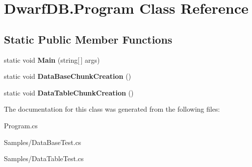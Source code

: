 \hypertarget{class_dwarf_d_b_1_1_program}{\section{Dwarf\+D\+B.\+Program Class Reference}
\label{class_dwarf_d_b_1_1_program}
}
\subsection*{Static Public Member Functions}
\begin{DoxyCompactItemize}
\item 
\hypertarget{class_dwarf_d_b_1_1_program_ad191792c625399b2912062074ad4476b}{static void {\bfseries Main} (string\mbox{[}$\,$\mbox{]} args)}\label{class_dwarf_d_b_1_1_program_ad191792c625399b2912062074ad4476b}

\item 
\hypertarget{class_dwarf_d_b_1_1_program_af6bc5554955f41aa161cd638dd1fcbc1}{static void {\bfseries Data\+Base\+Chunk\+Creation} ()}\label{class_dwarf_d_b_1_1_program_af6bc5554955f41aa161cd638dd1fcbc1}

\item 
\hypertarget{class_dwarf_d_b_1_1_program_abab621dfeced1fb0c770bd5a1dffe3a6}{static void {\bfseries Data\+Table\+Chunk\+Creation} ()}\label{class_dwarf_d_b_1_1_program_abab621dfeced1fb0c770bd5a1dffe3a6}

\end{DoxyCompactItemize}


The documentation for this class was generated from the following files\+:\begin{DoxyCompactItemize}
\item 
Program.\+cs\item 
Samples/Data\+Base\+Test.\+cs\item 
Samples/Data\+Table\+Test.\+cs\end{DoxyCompactItemize}
